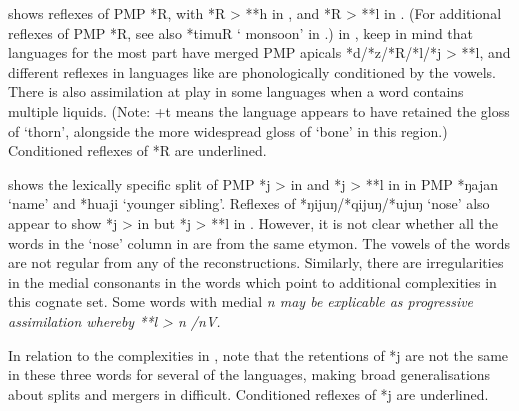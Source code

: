  shows reflexes of PMP *R,
with *R > **h in ,
and *R > **l in .
(For additional reflexes of PMP *R,
see also *timuR ‘ monsoon’ in .)  in ,
keep in mind that  languages for the most part
have merged PMP apicals *d/*z/*R/*l/*j > **l,
and different reflexes in languages like  are phonologically
conditioned by the vowels.
There is also assimilation at play in some languages when a word contains multiple liquids.
(Note: +t means the language appears to have retained the gloss
of ‘thorn’, alongside the more widespread gloss of ‘bone’ in this region.)
Conditioned reflexes of *R are underlined.

 shows the lexically specific split of PMP *j > {\0}
in  and *j > **l in  in PMP *ŋajan ‘name’
and *huaji ‘younger sibling’.
Reflexes of *ŋijuŋ/*qijuŋ/*ujuŋ ‘nose’ also appear to show *j
> {\0} in  but *j > **l in .
However, it is not clear whether all the words in the ‘nose’
column in  are from the same etymon.
The vowels of the  words are not regular from
any of the reconstructions.
Similarly, there are irregularities in the medial consonants
in the  words which point to additional complexities
in this cognate set.
Some  words with medial \it{n} may be explicable
as progressive assimilation whereby **l > \it{n} /nV{\gap}.

 In relation to the complexities in ,
note that the retentions of *j are not the same in these three
words for several of the languages,
making broad generalisations about splits
and mergers in  difficult.
Conditioned reflexes of *j are underlined.

